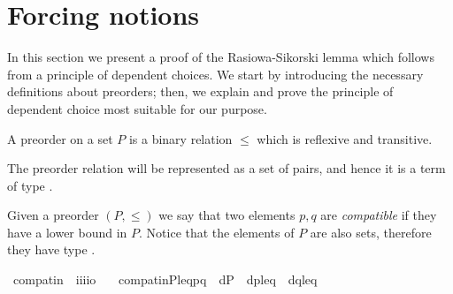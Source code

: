 \section{Forcing notions}\label{sec:forcing-notions}

In this section we present a proof of the Rasiowa-Sikorski lemma which
follows from a principle of dependent choices. We start by introducing
the necessary definitions about preorders; then, we explain and prove
the principle of dependent choice most suitable for our purpose.

\begin{definition}
  A preorder on a set $P$ is a binary relation ${\leqslant}$ which is
  reflexive and transitive.
\end{definition}

The preorder relation will be represented as a set of pairs, and hence
it is a term of type
.
\begin{definition}
  Given a preorder $(P,\leqslant)$ we say that two elements $p,q$ are
  \emph{compatible} if they have a lower bound in $P$. Notice that
  the elements of $P$ are also sets, therefore they have type
  .
  \begin{isabelle}%
  \isamarkupfalse%
\ compat{\isacharunderscore}in\ {\isacharcolon}{\isacharcolon}\ {\isachardoublequoteopen}i{\isasymRightarrow}i{\isasymRightarrow}i{\isasymRightarrow}i{\isasymRightarrow}o{\isachardoublequoteclose}\ \isanewline
\ \ {\isachardoublequoteopen}compat{\isacharunderscore}in{\isacharparenleft}P{\isacharcomma}leq{\isacharcomma}p{\isacharcomma}q{\isacharparenright}\ {\isacharequal}{\isacharequal}\ {\isasymexists}d{\isasymin}P\ {\isachardot}\ {\isasymlangle}d{\isacharcomma}p{\isasymrangle}{\isasymin}leq\ {\isasymand}\ {\isasymlangle}d{\isacharcomma}q{\isasymrangle}{\isasymin}leq{\isachardoublequoteclose}
\end{isabelle}
\end{definition}

